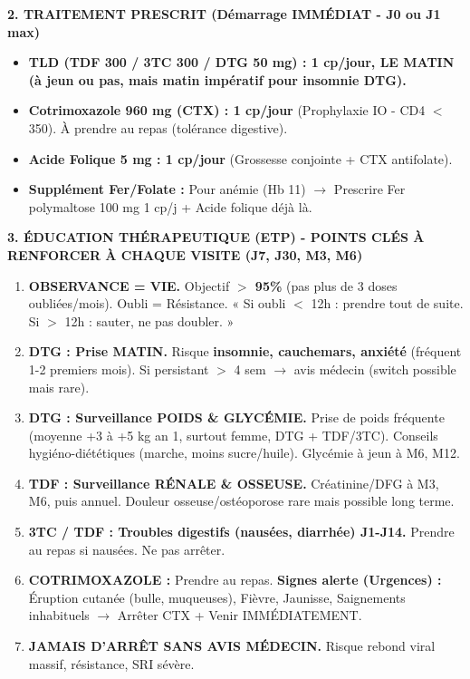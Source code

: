 \documentclass[11pt]{article}
\begin{document}
\begin{exoresolu}
\noindent\textbf{2. TRAITEMENT PRESCRIT (Démarrage \textbf{IMMÉDIAT - J0 ou J1 max})}
\begin{itemize}
    \item \textbf{TLD (TDF 300 / 3TC 300 / DTG 50 mg) : 1 cp/jour, \textbf{LE MATIN} (à jeun ou pas, mais matin impératif pour insomnie DTG).}
    \item \textbf{Cotrimoxazole 960 mg (CTX) : 1 cp/jour} (Prophylaxie IO - CD4 $<$ 350). À prendre au repas (tolérance digestive).
    \item \textbf{Acide Folique 5 mg : 1 cp/jour} (Grossesse conjointe + CTX antifolate).
    \item \textbf{Supplément Fer/Folate :} Pour anémie (Hb 11) $\rightarrow$ Prescrire Fer polymaltose 100 mg 1 cp/j + Acide folique déjà là.
\end{itemize}

\noindent\textbf{3. ÉDUCATION THÉRAPEUTIQUE (ETP) - POINTS CLÉS À RENFORCER À CHAQUE VISITE (J7, J30, M3, M6)}
\begin{enumerate}
    \item \textbf{OBSERVANCE = VIE.} Objectif \textbf{$>$ 95\%} (pas plus de 3 doses oubliées/mois). Oubli = Résistance. « Si oubli $<$ 12h : prendre tout de suite. Si $>$ 12h : sauter, ne pas doubler. »
    \item \textbf{DTG : Prise MATIN.} Risque \textbf{insomnie, cauchemars, anxiété} (fréquent 1-2 premiers mois). Si persistant $>$ 4 sem $\rightarrow$ avis médecin (switch possible mais rare).
    \item \textbf{DTG : Surveillance POIDS \& GLYCÉMIE.} Prise de poids fréquente (moyenne +3 à +5 kg an 1, surtout femme, DTG + TDF/3TC). Conseils hygiéno-diététiques (marche, moins sucre/huile). Glycémie à jeun à M6, M12.
    \item \textbf{TDF : Surveillance RÉNALE \& OSSEUSE.} Créatinine/DFG à M3, M6, puis annuel. Douleur osseuse/ostéoporose rare mais possible long terme.
    \item \textbf{3TC / TDF : Troubles digestifs (nausées, diarrhée) J1-J14.} Prendre au repas si nausées. Ne pas arrêter.
    \item \textbf{COTRIMOXAZOLE :} Prendre au repas. \textbf{Signes alerte (Urgences) :} Éruption cutanée (bulle, muqueuses), Fièvre, Jaunisse, Saignements inhabituels $\rightarrow$ Arrêter CTX + Venir IMMÉDIATEMENT.
    \item \textbf{JAMAIS D'ARRÊT SANS AVIS MÉDECIN.} Risque rebond viral massif, résistance, SRI sévère.
\end{enumerate}


\end{exoresolu}
\end{document}
